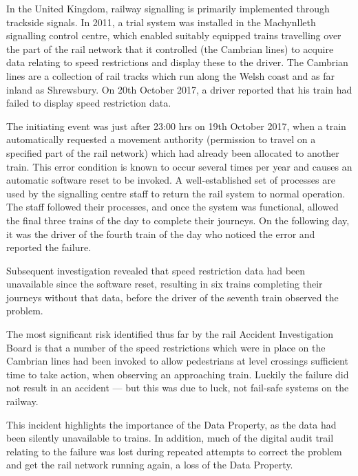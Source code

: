 In the United Kingdom, railway signalling is primarily implemented through trackside signals. In 2011, a trial system was installed in the Machynlleth signalling control centre, which enabled suitably equipped trains travelling over the part of the rail network that it controlled (the Cambrian lines) to acquire data relating to speed restrictions and display these to the driver. The Cambrian lines are a collection of rail tracks which run along the Welsh coast and as far inland as Shrewsbury. On 20th October 2017, a driver reported that his train had failed to display speed restriction data.

The initiating event was just after 23:00 hrs on 19th October 2017, when a train automatically requested a movement authority (permission to travel on a specified part of the rail network) which had already been allocated to another train. This error condition is known to occur several times per year and causes an automatic software reset to be invoked. A well-established set of processes are used by the signalling centre staff to return the rail system to normal operation. The staff followed their processes, and once the system was functional, allowed the final three trains of the day to complete their journeys. On the following day, it was the driver of the fourth train of the day who noticed the error and reported the failure.

Subsequent investigation revealed that speed restriction data had been unavailable since the software reset, resulting in six trains completing their journeys without that data, before the driver of the seventh train observed the problem. 

The most significant risk identified thus far by the rail Accident Investigation Board is that a number of the speed restrictions which were in place on the Cambrian lines had been invoked to allow pedestrians at level crossings sufficient time to take action, when observing an approaching train. Luckily the failure did not result in an accident --- but this was due to luck, not fail-safe systems on the railway.

This incident highlights the importance of the  Data Property, as the data had been silently unavailable to trains. In addition, much of the digital audit trail relating to the failure was lost during repeated attempts to correct the problem and get the rail network running again, a loss of the  Data Property.

